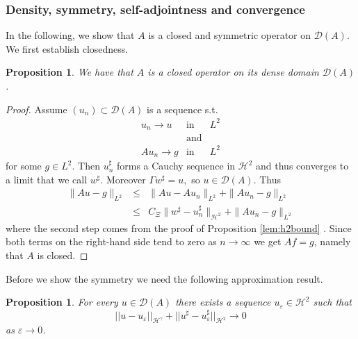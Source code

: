 \documentclass[11pt, oneside]{article}   	%
\newcommand{\tmop}[1]{\ensuremath{\operatorname{#1}}}
\newtheorem{proposition}[theorem]{Proposition}
\newcommand{\ssp}{\mathscr{H}}
\begin{document}
\subsubsection{Density, symmetry, self-adjointness and convergence}

In the following, we show that $A$ is a closed and symmetric operator on $\mathscr{D}(A)$.  We first establish closedness.

\begin{proposition} \label{prop:opclosed}
	We have that $A$ is a closed  operator on its dense domain $\mathscr{D}(A)$.
\end{proposition}

\begin{proof}
	Assume $(u_n) \subset \mathscr{D} (A)$ is
	a sequence s.t.
	\begin{eqnarray*}
		u_n \rightarrow u & \tmop{in} & L^2\\
		& \tmop{and} & \\
		A u_n \rightarrow g & \tmop{in} & L^2
	\end{eqnarray*}
	for some $g \in L^2 .$ Then $u_n^{\sharp}$ forms a Cauchy
	sequence in $\ssp^2$ and thus converges to a limit that we call
	$w^{\sharp}$. Moreover $\Gamma w^{\sharp} = u,$ so
	$u \in \mathscr{D} (A)
	.$ Thus
	\begin{eqnarray*}
		\| A u - g \|_{L^2} & \le & \| A u - A u_n \|_{L^2} + \| A u_n - g
		\|_{L^2}\\
		& \le & C_\Xi \| w^{\sharp}- u_n^{\sharp} \|_{\mathscr{H}^2} + \| A u_n - g
		\|_{L^2}
	\end{eqnarray*}
	where the second step comes from the proof of Proposition \ref{lem:h2bound} . Since
	both terms on the right-hand side tend to zero as $n \rightarrow \infty$ we
	get $A f = g$, namely that $A$ is closed.
	
	\end{proof}

Before we show the symmetry we need the following approximation result.

\begin{proposition} \label{prop:opclosed}
For every $u \in \mathscr{D}(A)$ there exists a sequence $u_\varepsilon \in \mathscr{H}^2$ such that 
\begin{equation} \label{equ:h2app}
|| u - u_\varepsilon  ||_{\mathscr{H}^\gamma} + || u^\sharp - u_\varepsilon^\sharp ||_{\mathscr{H}^2} \rightarrow 0
\end{equation}
as $\varepsilon \rightarrow 0$. 
\end{proposition}
\end{document}
